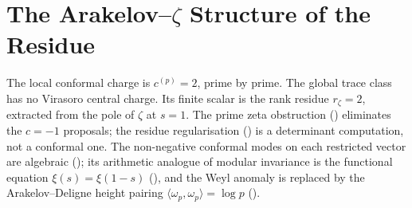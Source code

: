 \section{The Arakelov--\(\zeta\) Structure of the Residue}
\label{v4-arith:pol:arakelov-zeta-structure}

The local conformal charge is \(c^{(p)}=2\), prime by prime. The
global trace class has no Virasoro central charge. Its finite scalar
is the rank residue \(r_{\zeta}=2\), extracted from the pole of
\(\zeta\) at \(s=1\).
The prime zeta obstruction ()
eliminates the \(c=-1\) proposals;
the residue regularisation ()
is a determinant computation, not a conformal one.
The non-negative conformal modes on each restricted vector are algebraic
();
its arithmetic analogue of modular invariance is the functional equation
\(\xi(s)=\xi(1-s)\) (),
and the Weyl anomaly is replaced by the Arakelov--Deligne height pairing
\(\langle\omega_p,\omega_p\rangle=\log p\) ().
